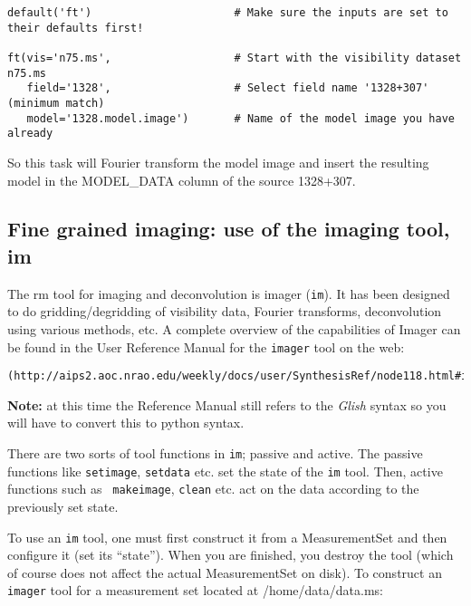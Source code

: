 \small
\begin{verbatim}
default('ft')                      # Make sure the inputs are set to their defaults first!

ft(vis='n75.ms',                   # Start with the visibility dataset n75.ms
   field='1328',                   # Select field name '1328+307' (minimum match) 
   model='1328.model.image')       # Name of the model image you have already
\end{verbatim}
\normalsize

So this task will Fourier transform the model image and insert the
resulting model in the MODEL\_DATA column of the source 1328+307.  

    


\subsection{Fine grained imaging: use of the imaging tool, im}
\label{subsection:image.tools}

The {rm tool} for imaging and deconvolution is imager ({\tt im}).  It
has been designed to do gridding/degridding of visibility data,
Fourier transforms, deconvolution using various methods, etc. A
complete overview of the capabilities of Imager can be found in the
User Reference Manual for the {\tt imager} tool on the web:

\small
\begin{verbatim}
(http://aips2.aoc.nrao.edu/weekly/docs/user/SynthesisRef/node118.html#imager);
\end{verbatim}
\normalsize

\vspace{3mm}
\noindent 
{\bf Note:} at this time the Reference Manual still refers to the {\it
Glish} syntax so you will have to convert this to python syntax.

There are two sorts of tool functions in {\tt im}; passive and active.
The passive functions like {\tt setimage}, {\tt setdata} etc. set the
state of the {\tt im} tool.  Then, active functions such as {\tt
makeimage}, {\tt clean} etc. act on the data according to the
previously set state.

To use an {\tt im} tool, one must first construct it from a
MeasurementSet and then configure it (set its ``state'').  When you
are finished, you destroy the tool (which of course does not affect
the actual MeasurementSet on disk).  To construct an {\tt imager} tool
for a measurement set located at /home/data/data.ms:

